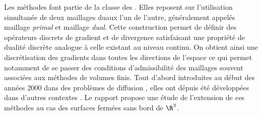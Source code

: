 Les méthodes \ddfv font partie de la classe des . Elles reposent sur l'utilisation simultanée de deux maillages duaux l'un de l'autre, généralement appelés maillage \emph{primal} et maillage \emph{dual}. Cette construction permet de définir des opérateurs discrets de gradient et de divergence satisfaisant une propriété de dualité discrète analogue à celle existant au niveau continu. On obtient ainsi une discrétisation des gradients dans toutes les directions de l'espace ce qui permet notamment de se passer des conditions d'admissibilité des maillages souvent associées aux méthodes de volumes finis. Tout d'abord introduites au début des années 2000 dans des problèmes de diffusion \cite{hermeline_finite_2000}, elles ont dépuis été développées dans d'autres contextes \cite{domelevo_finite_2005,andreianov_discrete_2009,cances_convergence_2010,boyer_ddfv_2017,goudon_ddfv_2019}. Le rapport propose une étude de l'extension de ces méthodes au cas des surfaces fermées sans bord de $\R^3$. \\

